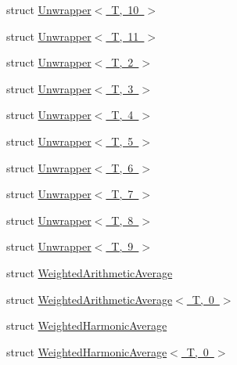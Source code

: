 \begin{DoxyCompactItemize}
struct \mbox{\hyperlink{structmpc_1_1utilities_1_1_unwrapper_3_01_t_00_0110_01_4}{Unwrapper$<$ T, 10 $>$}}
\item 
struct \mbox{\hyperlink{structmpc_1_1utilities_1_1_unwrapper_3_01_t_00_0111_01_4}{Unwrapper$<$ T, 11 $>$}}
\item 
struct \mbox{\hyperlink{structmpc_1_1utilities_1_1_unwrapper_3_01_t_00_012_01_4}{Unwrapper$<$ T, 2 $>$}}
\item 
struct \mbox{\hyperlink{structmpc_1_1utilities_1_1_unwrapper_3_01_t_00_013_01_4}{Unwrapper$<$ T, 3 $>$}}
\item 
struct \mbox{\hyperlink{structmpc_1_1utilities_1_1_unwrapper_3_01_t_00_014_01_4}{Unwrapper$<$ T, 4 $>$}}
\item 
struct \mbox{\hyperlink{structmpc_1_1utilities_1_1_unwrapper_3_01_t_00_015_01_4}{Unwrapper$<$ T, 5 $>$}}
\item 
struct \mbox{\hyperlink{structmpc_1_1utilities_1_1_unwrapper_3_01_t_00_016_01_4}{Unwrapper$<$ T, 6 $>$}}
\item 
struct \mbox{\hyperlink{structmpc_1_1utilities_1_1_unwrapper_3_01_t_00_017_01_4}{Unwrapper$<$ T, 7 $>$}}
\item 
struct \mbox{\hyperlink{structmpc_1_1utilities_1_1_unwrapper_3_01_t_00_018_01_4}{Unwrapper$<$ T, 8 $>$}}
\item 
struct \mbox{\hyperlink{structmpc_1_1utilities_1_1_unwrapper_3_01_t_00_019_01_4}{Unwrapper$<$ T, 9 $>$}}
\item 
struct \mbox{\hyperlink{structmpc_1_1utilities_1_1_weighted_arithmetic_average}{Weighted\+Arithmetic\+Average}}
\item 
struct \mbox{\hyperlink{structmpc_1_1utilities_1_1_weighted_arithmetic_average_3_01_t_00_010_01_4}{Weighted\+Arithmetic\+Average$<$ T, 0 $>$}}
\item 
struct \mbox{\hyperlink{structmpc_1_1utilities_1_1_weighted_harmonic_average}{Weighted\+Harmonic\+Average}}
\item 
struct \mbox{\hyperlink{structmpc_1_1utilities_1_1_weighted_harmonic_average_3_01_t_00_010_01_4}{Weighted\+Harmonic\+Average$<$ T, 0 $>$}}
\end{DoxyCompactItemize}

